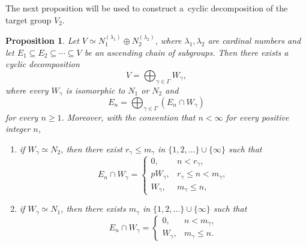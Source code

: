 \documentclass[11pt]{article}
\newtheorem{prop}[thm]{Proposition}
\theoremstyle{definition}
\begin{document}
The next proposition will be used to construct a~cyclic
decomposition of the target group $V_2$.

\begin{prop}\label{prop:simultaneous-target}
	Let $V\simeq N_1^{(\lambda_1)}\oplus N_2^{(\lambda_2)}$, where $\lambda_1,\lambda_2$ are cardinal numbers
	and let $E_1\subseteq E_2\subseteq\cdots\subseteq V$
	be an ascending chain of subgroups.
	Then there exists a cyclic decomposition
	\[
	V=\bigoplus_{\gamma\in\Gamma}W_\gamma,
	\]
	where every $W_\gamma$ is isomorphic to $N_1$ or $N_2$ and
	$$
	E_n=\bigoplus_{\gamma\in\Gamma}(E_n\cap W_\gamma)
	$$
	for every $n\geq1$.
	Moreover, with the convention that $n<\infty$ for every
	positive integer $n$,
\begin{enumerate}
	\item
	if $W_\gamma\simeq N_2$, then there exist  $r_\gamma\leq m_\gamma$
	in $\{1,2,\dots\}\cup\{\infty\}$
	such that
	\[
	E_n\cap W_\gamma=
	\begin{cases}
		0,&n<r_\gamma,\\
		pW_\gamma,&r_\gamma\leq n<m_\gamma,\\
		W_\gamma,&m_\gamma\leq n,
	\end{cases}
	\]
	
\item	if $W_\gamma\simeq N_1$, then there exists 
	$m_\gamma$ in $\{1,2,\dots\}\cup\{\infty\}$ such that
	$$
	E_n\cap W_\gamma=
	\begin{cases}
		0,&n<m_\gamma,\\
		W_\gamma,&m_\gamma\leq n.
	\end{cases}
	$$
\end{enumerate}	
	
\end{prop}
\end{document}
